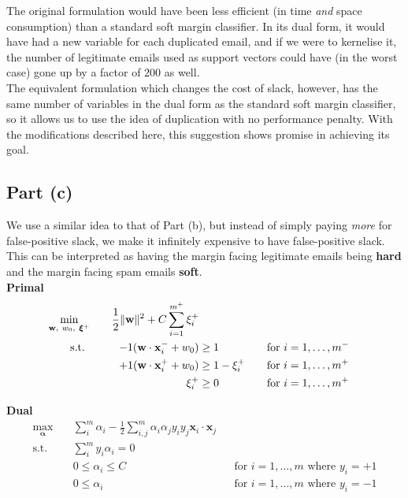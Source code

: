 The original formulation would have been less efficient (in time \textit{and} space consumption) than a standard soft margin classifier. In its dual form, it would have had a new variable for each duplicated email, and if we were to kernelise it, the number of legitimate emails used as support vectors could have (in the worst case) gone up by a factor of 200 as well.\\[1em]

The equivalent formulation which changes the cost of slack, however, has the same number of variables in the dual form as the standard soft margin classifier, so it allows us to use the idea of duplication with no performance penalty. With the modifications described here, this suggestion shows promise in achieving its goal.

\subsection{Part (c)}
We use a similar idea to that of Part (b), but instead of simply paying \textit{more} for false-positive slack, we make it infinitely expensive to have false-positive slack. This can be interpreted as having the margin facing legitimate emails being \textbf{hard} and the margin facing spam emails \textbf{soft}.\\[1em]

\noindent\textbf{Primal}
\begin{alignat*}{3}
  \min_{\mathbf{w},~w_0,~\boldsymbol\xi^+}\quad&&\frac{1}{2}\lVert\mathbf{w}\rVert^2 + C\sum_{i=1}^{m^+}\xi_i^+\\
  \text{s.t. }\quad&&-1(\mathbf{w}\cdot\mathbf{x}_i^-+w_0) & \geq 1 &&\quad\text{for }i = 1,\ldots,m^-
  \\ &&+1(\mathbf{w}\cdot\mathbf{x}_i^++w_0) & \geq 1 - \xi_i^+ &&\quad\text{for }i = 1,\ldots,m^+
  \\ &&\xi_i^+ & \geq 0 &&\quad\text{for }i=1,\ldots,m^+
\end{alignat*}

\noindent\textbf{Dual}
\begin{align*}
  \max_{\boldsymbol\alpha}\quad&\sum_{i}^m\alpha_i-\frac{1}{2}\sum_{i,j}^{m}\alpha_i\alpha_jy_iy_j\mathbf{x}_i\cdot\mathbf{x}_j\\
  \text{s.t.}\quad&\sum_i^my_i\alpha_i = 0
  \\ & 0\leq\alpha_i\leq C && \text{for }i=1,\ldots,m\text{ where }y_i=+1
  \\ & 0\leq\alpha_i &&\text{for }i=1,\ldots,m\text{ where }y_i=-1
\end{align*}

